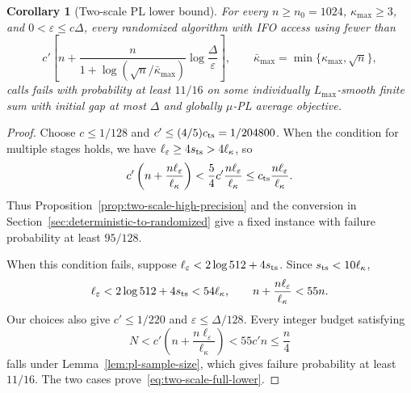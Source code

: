 \documentclass{article}
\newtheorem{corollary}[theorem]{Corollary}
\theoremstyle{definition}
\begin{document}
\begin{corollary}[Two-scale PL lower bound]
\label{cor:two-scale-pl-lower}
For every $n\ge n_0=1024$, $\kappa_{\max}\ge3$, and
$0<\varepsilon\le c\Delta$, every randomized algorithm with IFO access
using fewer than
\begin{equation}
 c'\left[
 n+\frac{n}{1+\log(\sqrt n/\bar\kappa_{\max})}
 \log\frac{\Delta}{\varepsilon}
 \right],
 \qquad \bar\kappa_{\max}=\min\{\kappa_{\max},\sqrt n\},
 \label{eq:two-scale-full-lower}
\end{equation}
calls fails with probability at least $11/16$ on some individually
$L_{\max}$-smooth finite sum with initial gap at most $\Delta$ and globally
$\mu$-PL average objective.
\end{corollary}

\begin{proof}
Choose $c\le1/128$ and $c'\le(4/5)c_{\rm ts}=1/204800$.
When the condition for multiple stages holds,
we have $\ell_\varepsilon\ge4s_{\rm ts}>4\ell_\kappa$, so
\[
 c'\left(n+\frac{n\ell_\varepsilon}{\ell_\kappa}\right)
 <\frac54c'\frac{n\ell_\varepsilon}{\ell_\kappa}
 \le c_{\rm ts}\frac{n\ell_\varepsilon}{\ell_\kappa}.
\]
Thus Proposition~\ref{prop:two-scale-high-precision} and the conversion in
Section~\ref{sec:deterministic-to-randomized} give a fixed instance with
failure probability at least $95/128$.

When this condition fails, suppose
$\ell_\varepsilon<2\log512+4s_{\rm ts}$.  Since
$s_{\rm ts}<10\ell_\kappa$,
\begin{equation}
 \ell_\varepsilon<2\log512+4s_{\rm ts}<54\ell_\kappa,
 \qquad
 n+\frac{n\ell_\varepsilon}{\ell_\kappa}<55n.
 \label{eq:two-scale-coarse-log}
\end{equation}
Our choices also give $c'\le1/220$ and $\varepsilon\le\Delta/128$.
Every integer budget satisfying
\begin{equation}
 N<c'\left(n+\frac{n\ell_\varepsilon}{\ell_\kappa}\right)
 <55c'n\le\frac n4
\end{equation}
falls under Lemma~\ref{lem:pl-sample-size}, which gives failure probability at
least $11/16$.  The two cases prove~\eqref{eq:two-scale-full-lower}.
\end{proof}
\end{document}
